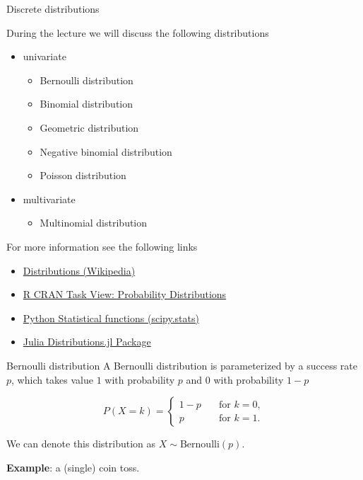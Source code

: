 \documentclass[10pt,ignorenonframetext,aspectratio=169]{beamer}
\begin{document}
\begin{frame}[fragile]{Discrete distributions}

During the lecture we will discuss the following distributions

\begin{itemize}
    \item univariate
    
    \begin{itemize}
        \item Bernoulli distribution
        \item Binomial distribution
        \item Geometric distribution
        \item Negative binomial distribution
        \item Poisson distribution
    \end{itemize}
    \item multivariate
    
        \begin{itemize}
        \item Multinomial distribution 
    \end{itemize}
    
    \end{itemize}

For more information see the following links


\begin{itemize}
    \item \href{https://en.wikipedia.org/wiki/List_of_probability_distributions#Discrete_distributions}{Distributions (Wikipedia)}
    \item \href{https://cran.r-project.org/web/views/Distributions.html}{R CRAN Task View: Probability Distributions} 
    \item \href{https://docs.scipy.org/doc/scipy/reference/stats.html}{Python Statistical functions (scipy.stats)} 
    \item \href{https://juliastats.github.io/Distributions.jl/stable/}{Julia Distributions.jl Package}
\end{itemize}
\end{frame}



\begin{frame}{Bernoulli distribution}
    A Bernoulli distribution is parameterized by a success rate $p$, which takes value $1$ with probability $p$ and $0$ with probability $1-p$

\begin{equation}
    P(X = k) = \begin{cases}
1 - p & \quad \text{for } k = 0, \\
p & \quad \text{for } k = 1.
\end{cases}
\end{equation}

We can denote this distribution as $X \sim \mathrm{Bernoulli}(p)$.

\vspace{0.5cm}

\textbf{Example}: a (single) coin toss.

\end{frame}
\end{document}
